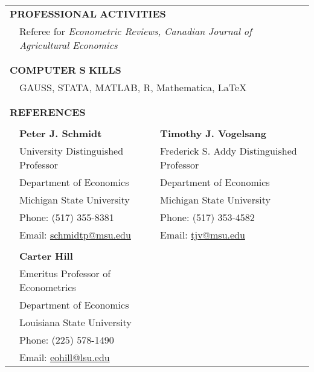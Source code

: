 \documentclass[10pt]{article}
\begin{document}
\begin{center}
\begin{tabular}{llllr}
\multicolumn{5}{l}{{\Large \textbf{P}}\textbf{ROFESSIONAL} {\Large \textbf{A}}\textbf{CTIVITIES}} \vspace{0.1cm}\\
& \multicolumn{4}{l}{Referee for \emph{Econometric Reviews, Canadian Journal of Agricultural Economics}}\\
\multicolumn{5}{l}{}\\\\
\multicolumn{5}{l}{{\Large \textbf{C}}\textbf{OMPUTER} {\Large \textbf{S}}%
\textbf{KILLS}} \vspace{0.1cm} \\
&\multicolumn{4}{l}{GAUSS, STATA, MATLAB, R, Mathematica, \LaTeX}\\
%
\multicolumn{5}{l}{}\\\\
\multicolumn{5}{l}{{\Large \textbf{R}}\textbf{EFERENCES}}\\
\multicolumn{1}{p{20pt}}{}&\multicolumn{1}{p{130pt}}{}&\multicolumn{1}{p{70pt}}{}&\multicolumn{1}{p{130pt}}{}&\multicolumn{1}{p{110pt}}{}\\
\multicolumn{1}{p{10pt}}{}&\multicolumn{2}{l}{\textbf{Peter J. Schmidt}} & \multicolumn{2}{l}{\textbf{Timothy J. Vogelsang}} \\
&\multicolumn{2}{l}{University Distinguished Professor} &\multicolumn{2}{l}{Frederick S. Addy Distinguished Professor} \\
&\multicolumn{2}{l}{Department of Economics} &\multicolumn{2}{l}{Department of Economics} \\
&\multicolumn{2}{l}{Michigan State University} &\multicolumn{2}{l}{Michigan State University}\\
&\multicolumn{2}{l}{Phone: (517) 355-8381}&\multicolumn{2}{l}{Phone: (517) 353-4582} \\
&\multicolumn{2}{l}{Email:  \href{mailto:schmidtp@msu.edu}{schmidtp@msu.edu}}&\multicolumn{2}{l}{Email: \href{mailto:tjv@msu.edu}{tjv@msu.edu}}\\ 
\multicolumn{5}{l}{}\\
& \multicolumn{2}{l}{\textbf{Carter Hill}}&\multicolumn{2}{l}{}\\
&\multicolumn{2}{l}{Emeritus Professor of Econometrics}&\multicolumn{2}{l}{}\\
& \multicolumn{2}{l}{Department of Economics}&\multicolumn{2}{l}{}\\
&\multicolumn{2}{l}{Louisiana State University}&\multicolumn{2}{l}{}\\
&\multicolumn{2}{l}{Phone: (225) 578-1490}&\multicolumn{2}{l}{}\\
&\multicolumn{2}{l}{Email:  \href{mailto:eohill@lsu.edu}{eohill@lsu.edu}}&\multicolumn{2}{l}{}
\end{tabular}

\end{center}
\end{document}
